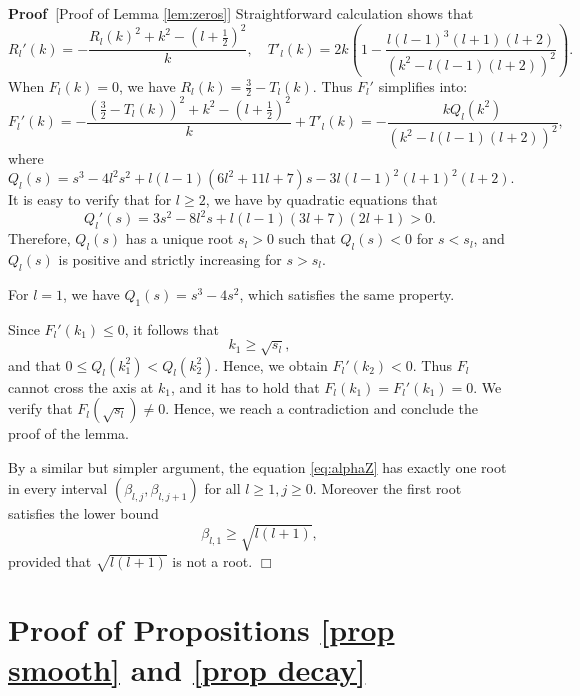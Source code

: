 \documentclass[11pt,a4paper]{article}
\numberwithin{equation}{section}
\newenvironment{proof}{\noindent\textbf{Proof\ }}{\hspace*{\fill}$\Box$\medskip}
\begin{document}
\begin{proof}[Proof of Lemma \ref{lem:zeros}]
  Straightforward calculation shows that
  \[ R_l' (k) = - \frac{R_l (k)^2 + k^2 - \left( l + \frac{1}{2}
     \right)^2}{k}, \quad T'_l (k) = 2 k \left( 1 - \frac{l (l - 1)^3 (l + 1)
     (l + 2)}{(k^2 - l (l - 1) (l + 2))^2} \right) . \]
  When $F_l (k) = 0$, we have $R_l (k) = \frac{3}{2} - T_l (k)$. Thus $F_l'$
  simplifies into:
  \[ F_l' (k) = - \frac{\left( \frac{3}{2} - T_l (k) \right)^2 + k^2 - \left(
     l + \frac{1}{2} \right)^2}{k} + T'_l (k) = - \frac{kQ_l (k^2)}{(k^2 - l
     (l - 1) (l + 2))^2}, \]
  where
  \[ Q_l (s) = s^3 - 4 l^2 s^2 + l (l - 1)  (6 l^2 + 11 l + 7) s - 3 l (l -
     1)^2  (l + 1)^2  (l + 2) . \]
  It is easy to verify that for $l \geqslant 2$, we have by quadratic
  equations that
  \[ Q_l' (s) = 3 s^2 - 8 l^2 s + l (l - 1)  (3 l + 7)  (2 l + 1) > 0. \]
  Therefore, $Q_l (s)$ has a unique root $s_l > 0$ such that $Q_l (s) < 0$ for
  $s < s_l$, and $Q_l (s)$ is positive and strictly increasing for $s > s_l$.
  
  For $l = 1$, we have $Q_1 (s) = s^3 - 4 s^2$, which satisfies the same
  property.
  
  Since $F_l' (k_1) \leqslant 0$, it follows that
  \[ k_1 \geqslant \sqrt{s_l}, \]
  and that $0 \leqslant Q_l (k_1^2) < Q_l (k_2^2)$. Hence, we obtain $F_l'
  (k_2) < 0$. Thus $F_l$ cannot cross the axis at $k_1$, and it has to hold
  that $F_l (k_1) = F_l' (k_1) = 0$. We verify that $F_l (\sqrt{s_l}) \neq 0$.
  Hence, we reach a contradiction and conclude the proof of the lemma.
  
  By a similar but simpler argument, the equation \eqref{eq:alphaZ} has
  exactly one root in every interval $(\beta_{l, j}, \beta_{l, j + 1})$ for
  all $l \geqslant 1, j \geqslant 0$. Moreover the first root satisfies the
  lower bound
  \[ \beta_{l, 1} \geqslant \sqrt{l (l + 1)}, \]
  provided that $\sqrt{l (l + 1)}$ is not a root.
\end{proof}

\section{Proof of Propositions \ref{prop smooth} and \ref{prop decay}}\label{App-Smooth-Decay}
\end{document}
